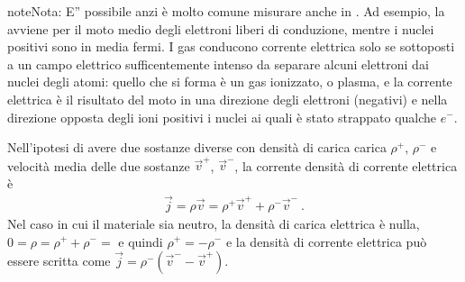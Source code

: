 \documentclass[letterpaper,10pt,italian]{jupyterBook}
\begin{document}
\begin{sphinxadmonition}{note}{Nota:}
\sphinxAtStartPar
E” possibile \sphinxhyphen{} anzi è molto comune \sphinxhyphen{} misurare  anche in . Ad esempio, la {\hyperref[\detokenize{ch/electromagnetism/electric-current:physics-hs-electromagnetism-electric-current-solids-conductor}]{}} avviene per il moto medio degli elettroni liberi di conduzione, mentre i nuclei positivi sono in media fermi. I gas conducono corrente elettrica solo se sottoposti a un campo elettrico sufficentemente intenso da separare alcuni elettroni dai nuclei degli atomi: quello che si forma è un gas ionizzato, o plasma, e la corrente elettrica è il risultato del moto in una direzione degli elettroni (negativi) e nella direzione opposta degli ioni positivi \sphinxhyphen{} i nuclei ai quali è stato strappato qualche \(e^-\).

\sphinxAtStartPar
Nell’ipotesi di avere due sostanze diverse con densità di carica carica \(\rho^+\), \(\rho^-\) e velocità media delle due sostanze \(\vec{v}^+\), \(\vec{v}^-\), la corrente densità di corrente elettrica è
\begin{equation*}
\begin{split}\vec{j} = \rho \vec{v} = \rho^+ \vec{v}^+ + \rho^- \vec{v}^- \ . \end{split}
\end{equation*}
\sphinxAtStartPar
Nel caso in cui il materiale sia neutro, la densità di carica elettrica è nulla, \(0 = \rho = \rho^+ + \rho^- =\) e quindi \(\rho^+ = - \rho^-\) e la densità di corrente elettrica può essere scritta come \(\vec{j} = \rho^- (\vec{v}^- - \vec{v}^+)\).
\end{sphinxadmonition}
\label{\detokenize{ch/electromagnetism/electric-current:electric-current-cable}}
\end{document}
